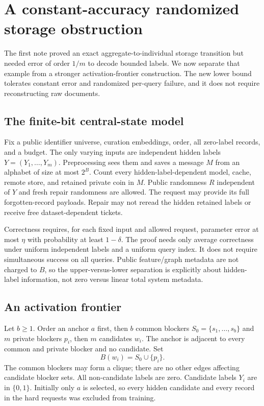 \documentclass[11pt,a4paper]{article}
\theoremstyle{definition}\newtheorem{definition}[theorem]{Definition}
\begin{document}
\section{A constant-accuracy randomized storage obstruction}\label{sec:phase}
The first note proved an exact aggregate-to-individual storage transition but needed error of order $1/m$ to decode bounded labels. We now separate that example from a stronger activation-frontier construction. The new lower bound tolerates constant error and randomized per-query failure, and it does not require reconstructing raw documents.

\subsection{The finite-bit central-state model}
Fix a public identifier universe, curation embeddings, order, all zero-label records, and a budget. The only varying inputs are independent hidden labels $Y=(Y_1,\ldots,Y_m)$. Preprocessing sees them and saves a message $M$ from an alphabet of size at most $2^B$. Count every hidden-label-dependent model, cache, remote store, and retained private coin in $M$. Public randomness $R$ independent of $Y$ and fresh repair randomness are allowed. The request may provide its full forgotten-record payloads. Repair may not reread the hidden retained labels or receive free dataset-dependent tickets.

Correctness requires, for each fixed input and allowed request, parameter error at most $\eta$ with probability at least $1-\delta$. The proof needs only average correctness under uniform independent labels and a uniform query index. It does not require simultaneous success on all queries. Public feature/graph metadata are not charged to $B$, so the upper-versus-lower separation is explicitly about hidden-label information, not zero versus linear total system metadata.

\subsection{An activation frontier}
Let $b\ge1$. Order an anchor $a$ first, then $b$ common blockers $S_0=\{s_1,\ldots,s_b\}$ and $m$ private blockers $p_i$, then $m$ candidates $w_i$. The anchor is adjacent to every common and private blocker and no candidate. Set
\[
 B(w_i)=S_0\cup\{p_i\}.
\]
The common blockers may form a clique; there are no other edges affecting candidate blocker sets. All non-candidate labels are zero. Candidate labels $Y_i$ are in $\{0,1\}$. Initially only $a$ is selected, so every hidden candidate and every record in the hard requests was excluded from training.
\end{document}
